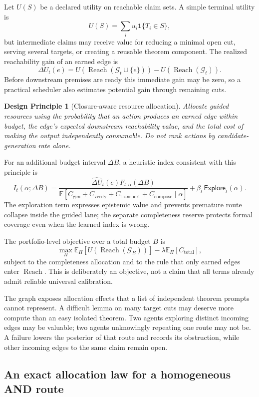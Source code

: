 \documentclass[11pt]{article}
\newtheorem{principle}[definition]{Design Principle}
\newcommand{\Reach}{\operatorname{Reach}}
\newcommand{\E}{\mathbb{E}}
\newcommand{\ind}{\mathbf{1}}
\begin{document}
Let $U(S)$ be a declared utility on reachable claim sets.  A simple terminal
utility is
\[
  U(S)=\sum_i u_i\ind\{T_i\in S\},
\]
but intermediate claims may receive value for reducing a minimal open cut,
serving several targets, or creating a reusable theorem component.  The
realized reachability gain of an earned edge is
\[
  \Delta U_t(e)
  =U(\Reach(\mathcal G_t\cup\{e\}))-U(\Reach(\mathcal G_t)).
\]
Before downstream premises are ready this immediate gain may be zero, so a
practical scheduler also estimates potential gain through remaining cuts.

\begin{principle}[Closure-aware resource allocation]\label{prn:closure-aware}
Allocate guided resources using the probability that an action produces an
earned edge within budget, the edge's expected downstream reachability value,
and the total cost of making the output independently consumable.  Do not rank
actions by candidate-generation rate alone.
\end{principle}

For an additional budget interval $\Delta B$, a heuristic index consistent
with this principle is
\[
  I_t(\alpha;\Delta B)
  =
  \frac{
    \widehat{\Delta U}_t(e)F_{t,\alpha}(\Delta B)
  }{
    \E[C_{\mathrm{gen}}+C_{\mathrm{verify}}+C_{\mathrm{transport}}
       +C_{\mathrm{compose}}\mid\alpha]
  }
  +\beta_t\,\mathsf{Explore}_t(\alpha).
\]
The exploration term expresses epistemic value and prevents premature route
collapse inside the guided lane; the separate completeness reserve protects
formal coverage even when the learned index is wrong.

The portfolio-level objective over a total budget $B$ is
\[
  \max_{\Pi}
  \E_\Pi\!\left[U(\Reach(\mathcal G_B))\right]
  -\lambda\E_\Pi[C_{\mathrm{total}}],
\]
subject to the completeness allocation and to the rule that only earned edges
enter $\Reach$.  This is deliberately an objective, not a claim that all terms
already admit reliable universal calibration.

The graph exposes allocation effects that a list of independent theorem
prompts cannot represent.  A difficult lemma on many target cuts may deserve
more compute than an easy isolated theorem.  Two agents exploring distinct
incoming edges may be valuable; two agents unknowingly repeating one route may
not be.  A failure lowers the posterior of that route and records its
obstruction, while other incoming edges to the same claim remain open.

\subsection{An exact allocation law for a homogeneous AND route}
\label{sec:and-allocation}
\end{document}
